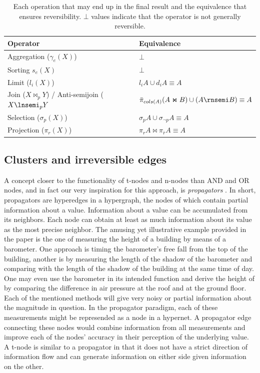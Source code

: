 \begin{table}[H]
  \centering
  \caption{\label{tab:reverse_cprresp}Each operation that may end up in the final result and the equivalence that ensures reversibility. \(\bot\) values indicate that the operator is not generally reversible.}
  \begin{tabular}{ll}
    Operator & Equivalence\\
    \hline
    Aggregation (\(\gamma_e(X)\)) & \(\bot\) \\
    Sorting \(s_e(X)\) & \(\bot\) \\
    Limit (\(l_i(X)\)) & \(l_i A \cup d_i A \equiv A\) \\
    Join (\(X \Join_p Y\)) / Anti-semijoin (\(X \lnsemi_p Y\) & \( \bar{\pi}_{cols(A)}(A \Join B) \cup (A \rnsemi B) \equiv A\)  \\
    Selection (\(\sigma_p(X)\)) & \(\sigma_p A \cup \sigma_{\neg p} A \equiv A\) \\
    Projection (\(\pi_r(X)\)) & \(\pi_r A \Join \pi_{\bar{r}} A \equiv A\) \\
  \end{tabular}
\end{table}

\subsection{Clusters and irreversible edges}

A concept closer to the
functionality of t-nodes and n-nodes than AND and OR nodes,
and in fact our very inspiration
for this approach, is \emph{propagators}
\cite{radulPropagationNetworksFlexible2009a}. In short, propagators are
hyperedges in a hypergraph, the nodes of which contain partial
information about a value. Information about a value can be
accumulated from its neighbors. Each node can obtain at least as much
information about its value as the most precise neighbor. The amusing
yet illustrative example provided in the paper is the one of measuring
the height of a building by means of a barometer. One approach is
timing the barometer's free fall from the top of the building, another
is by measuring the length of the shadow of the barometer and
comparing with the length of the shadow of the building at the same
time of day. One may even use the barometer in its intended function
and derive the height of by comparing the difference in air pressure
at the roof and at the ground floor. Each of the mentioned methods
will give very noisy or partial information about the magnitude in
question. In the propagator paradigm, each of these measurements might
be represended as a node in a hypernet. A propagator edge connecting
these nodes would combine information from all measurements and
improve each of the nodes' accuracy in their perception of the
underlying value. A t-node is similar to a propagator in that it does
not have a strict direction of information flow and can generate
information on either side given information on the other.

